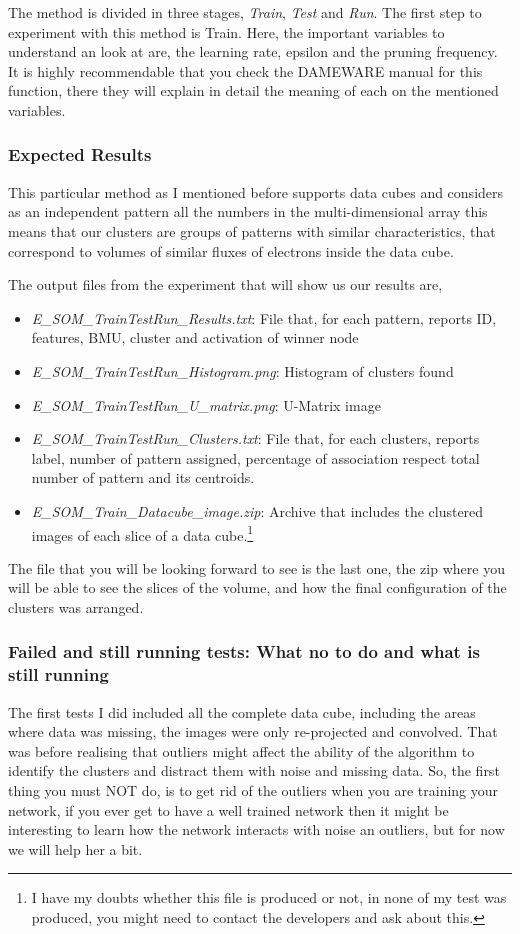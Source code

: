 \documentclass[11pt,fleqn]{book} %
\begin{document}
The method is divided in three stages, \emph{Train}, \emph{Test} and \emph{Run}.
The first step to experiment with this method is Train. Here, the important variables to understand an look at are, the learning rate, epsilon and the pruning frequency. It is highly recommendable that you check the DAMEWARE manual for this function, there they will explain in detail the meaning of each on the mentioned variables.

\subsubsection{Expected Results}
	This particular method as I mentioned before supports data cubes and considers as an independent pattern all the  numbers in the multi-dimensional array this means that our clusters are groups of patterns with similar characteristics, that correspond to volumes of similar fluxes of electrons inside the data cube.
    
    The output files from the experiment that will show us our results are, 
    \begin{itemize}
    	\item \emph{E\_SOM\_Train\/Test\/Run\_Results.txt}: File that, for each pattern, 
reports ID, features, BMU, cluster and activation of winner node
		\item \emph{E\_SOM\_Train\/Test\/Run\_Histogram.png}: Histogram of clusters found 
        \item \emph{E\_SOM\_Train\/Test\/Run\_U\_matrix.png}: U-Matrix image 
        \item \emph{E\_SOM\_Train\/Test\/Run\_Clusters.txt}: File that, for each clusters, reports label, number of pattern assigned, percentage of association respect total number of pattern and its centroids. 
        \item \emph{E\_SOM\_Train\_Datacube\_image.zip}: Archive that includes the 
clustered images of each slice of a data cube.\footnote{I have my doubts whether this file is produced or not, in none of my test was produced, you might need to contact the developers and ask about this.}
    \end{itemize}
The file that you will be looking forward to see is the last one, the zip where you will be able to see the slices of the volume, and how the final configuration of the clusters was arranged.

\subsubsection{Failed and still running tests: What no to do and what is still running}
The first tests I did included all the complete data cube, including the areas where data was missing, the images were only re-projected and convolved. That was before realising that outliers might affect the ability of the algorithm to identify the clusters and distract them with noise and missing data. So, the first thing you must NOT do, is to get rid of the outliers when you are training your network, if you ever get to have a well trained network then it might be interesting to learn how the network interacts with noise an outliers, but for now we will help her a bit. 
\end{document}
